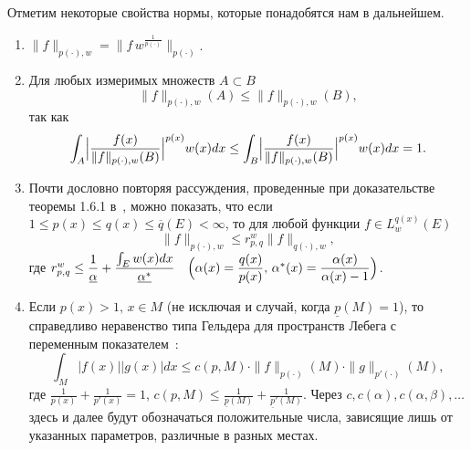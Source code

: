 Отметим некоторые свойства нормы, которые понадобятся нам в дальнейшем.
{
\renewcommand{\theenumi}{\arabic{enumi}$^\circ$}
\begin{enumerate}
\item\label{normLpxwLpx}
$\|f\|_{p(\cdot),w}=\|f \, w^{\frac{1}{p(\cdot)}}\|_{p(\cdot)}$.
\item\label{normPropSets}
Для любых измеримых множеств $A \subset B$
\begin{equation*}
  \|f\|_{p(\cdot),w}(A) \le \|f\|_{p(\cdot),w}(B),
\end{equation*}
так как
\begin{equation*}
  \int_{A}\Bigl|\frac{f(x)}{\|f\|_{p(\cdot),w}(B)}\Bigr|^{p(x)}w(x)dx \le
  \int_{B}\Bigl|\frac{f(x)}{\|f\|_{p(\cdot),w}(B)}\Bigr|^{p(x)}w(x)dx = 1.
\end{equation*}

\item\label{normpq}
Почти дословно повторяя рассуждения, проведенные при доказательстве теоремы 1.6.1 в~\cite{ShIIBJWShar3}, можно показать, что если $1\le p(x) \le q(x) \le \overline{q}(E) < \infty$, то для любой функции $f \in L^{q(x)}_w(E)$
\begin{equation*}
  \|f\|_{p(\cdot),w} \le r_{p,q}^w \|f\|_{q(\cdot),w},
\end{equation*}
где
$r_{p,q}^w \le \dfrac{1}{\underline{\alpha}}+\dfrac{\int_E w(x)dx}{\underline{\alpha^*}} \quad
\Bigl(\alpha(x)=\dfrac{q(x)}{p(x)}, \, \alpha^*(x)=\dfrac{\alpha(x)}{\alpha(x)-1}\Bigr)$.

\item\label{Holder}
Если $p(x)>1,\, x \in M$ (не исключая и случай, когда $\underline{p}(M)=1$), то справедливо неравенство типа Гельдера для пространств Лебега с переменным показателем~\cite[нер-во (8)]{ShIIBJWShar4}:
\begin{equation*}
  \int_M |f(x)||g(x)|dx \le
  c(p,M) \cdot \|f\|_{p(\cdot)}(M) \cdot \|g\|_{p'(\cdot)}(M),
\end{equation*}
где $\frac{1}{p(x)}+\frac{1}{p'(x)}=1$, $c(p,M)\le \frac{1}{\underline{p}(M)}+\frac{1}{\underline{p}'(M)}$.
Через $c, c(\alpha), c(\alpha,\beta),\ldots$ здесь и далее будут обозначаться положительные числа, зависящие лишь от указанных параметров, различные в разных местах.
\end{enumerate}
}




